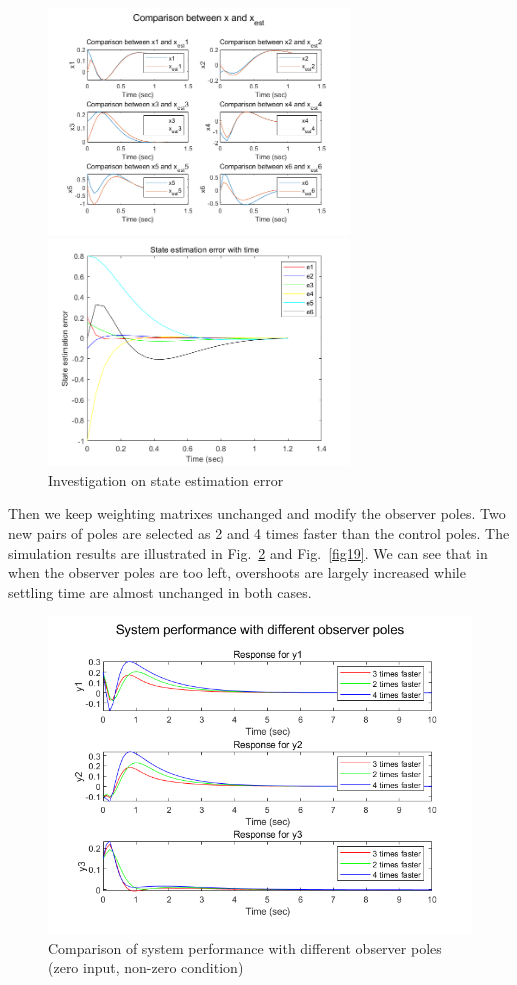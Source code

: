 \documentclass[hyperref]{article}
\theoremstyle{nonumberplain}
\begin{document}
	\begin{figure}[H]
		\centering
		\begin{minipage}[t]{0.48\textwidth}
			\centering
			\includegraphics[width=8cm]{fig23.png}
		\end{minipage}
		\begin{minipage}[t]{0.48\textwidth}
			\centering
			\includegraphics[width=8cm]{fig24.png}
		\end{minipage}
		\caption{Investigation on state estimation error}
		\label{fig17}
	\end{figure}
	
	Then we keep weighting matrixes unchanged and modify the observer poles. Two new pairs of poles are selected as 2 and 4 times faster than the control poles. The simulation results are illustrated in Fig.~\ref{fig18} and Fig.~\ref{fig19}. We can see that in when the observer poles are too left, overshoots are largely increased while settling time are almost unchanged in both cases.
	
	\begin{figure}[H]
		\centering
		\includegraphics[width=0.6\linewidth]{fig25.png}
		\caption{Comparison of system performance with different observer poles (zero input, non-zero condition)}
		\label{fig18}
	\end{figure}
\end{document}
